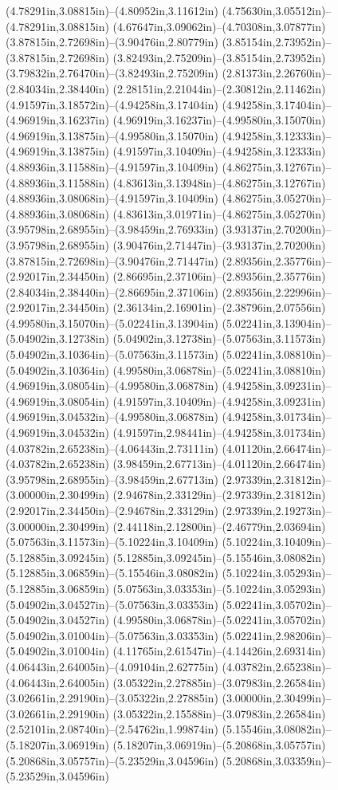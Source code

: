(4.78291in,3.08815in)--(4.80952in,3.11612in) (4.75630in,3.05512in)--(4.78291in,3.08815in) (4.67647in,3.09062in)--(4.70308in,3.07877in) (3.87815in,2.72698in)--(3.90476in,2.80779in) (3.85154in,2.73952in)--(3.87815in,2.72698in) (3.82493in,2.75209in)--(3.85154in,2.73952in) (3.79832in,2.76470in)--(3.82493in,2.75209in) (2.81373in,2.26760in)--(2.84034in,2.38440in) (2.28151in,2.21044in)--(2.30812in,2.11462in) (4.91597in,3.18572in)--(4.94258in,3.17404in) (4.94258in,3.17404in)--(4.96919in,3.16237in) (4.96919in,3.16237in)--(4.99580in,3.15070in) (4.96919in,3.13875in)--(4.99580in,3.15070in) (4.94258in,3.12333in)--(4.96919in,3.13875in) (4.91597in,3.10409in)--(4.94258in,3.12333in) (4.88936in,3.11588in)--(4.91597in,3.10409in) (4.86275in,3.12767in)--(4.88936in,3.11588in) (4.83613in,3.13948in)--(4.86275in,3.12767in) (4.88936in,3.08068in)--(4.91597in,3.10409in) (4.86275in,3.05270in)--(4.88936in,3.08068in) (4.83613in,3.01971in)--(4.86275in,3.05270in) (3.95798in,2.68955in)--(3.98459in,2.76933in) (3.93137in,2.70200in)--(3.95798in,2.68955in) (3.90476in,2.71447in)--(3.93137in,2.70200in) (3.87815in,2.72698in)--(3.90476in,2.71447in) (2.89356in,2.35776in)--(2.92017in,2.34450in) (2.86695in,2.37106in)--(2.89356in,2.35776in) (2.84034in,2.38440in)--(2.86695in,2.37106in) (2.89356in,2.22996in)--(2.92017in,2.34450in) (2.36134in,2.16901in)--(2.38796in,2.07556in) (4.99580in,3.15070in)--(5.02241in,3.13904in) (5.02241in,3.13904in)--(5.04902in,3.12738in) (5.04902in,3.12738in)--(5.07563in,3.11573in) (5.04902in,3.10364in)--(5.07563in,3.11573in) (5.02241in,3.08810in)--(5.04902in,3.10364in) (4.99580in,3.06878in)--(5.02241in,3.08810in) (4.96919in,3.08054in)--(4.99580in,3.06878in) (4.94258in,3.09231in)--(4.96919in,3.08054in) (4.91597in,3.10409in)--(4.94258in,3.09231in) (4.96919in,3.04532in)--(4.99580in,3.06878in) (4.94258in,3.01734in)--(4.96919in,3.04532in) (4.91597in,2.98441in)--(4.94258in,3.01734in) (4.03782in,2.65238in)--(4.06443in,2.73111in) (4.01120in,2.66474in)--(4.03782in,2.65238in) (3.98459in,2.67713in)--(4.01120in,2.66474in) (3.95798in,2.68955in)--(3.98459in,2.67713in) (2.97339in,2.31812in)--(3.00000in,2.30499in) (2.94678in,2.33129in)--(2.97339in,2.31812in) (2.92017in,2.34450in)--(2.94678in,2.33129in) (2.97339in,2.19273in)--(3.00000in,2.30499in) (2.44118in,2.12800in)--(2.46779in,2.03694in) (5.07563in,3.11573in)--(5.10224in,3.10409in) (5.10224in,3.10409in)--(5.12885in,3.09245in) (5.12885in,3.09245in)--(5.15546in,3.08082in) (5.12885in,3.06859in)--(5.15546in,3.08082in) (5.10224in,3.05293in)--(5.12885in,3.06859in) (5.07563in,3.03353in)--(5.10224in,3.05293in) (5.04902in,3.04527in)--(5.07563in,3.03353in) (5.02241in,3.05702in)--(5.04902in,3.04527in) (4.99580in,3.06878in)--(5.02241in,3.05702in) (5.04902in,3.01004in)--(5.07563in,3.03353in) (5.02241in,2.98206in)--(5.04902in,3.01004in) (4.11765in,2.61547in)--(4.14426in,2.69314in) (4.06443in,2.64005in)--(4.09104in,2.62775in) (4.03782in,2.65238in)--(4.06443in,2.64005in) (3.05322in,2.27885in)--(3.07983in,2.26584in) (3.02661in,2.29190in)--(3.05322in,2.27885in) (3.00000in,2.30499in)--(3.02661in,2.29190in) (3.05322in,2.15588in)--(3.07983in,2.26584in) (2.52101in,2.08740in)--(2.54762in,1.99874in) (5.15546in,3.08082in)--(5.18207in,3.06919in) (5.18207in,3.06919in)--(5.20868in,3.05757in) (5.20868in,3.05757in)--(5.23529in,3.04596in) (5.20868in,3.03359in)--(5.23529in,3.04596in) 